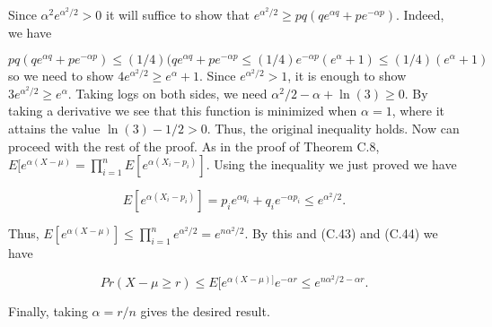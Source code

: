 \documentclass{article}
\begin{document}
Since $ \alpha^2e^{\alpha^2/2} > 0$ it will suffice to show that $e^{\alpha^2/2} \geq pq(qe^{\alpha q} + pe^{-\alpha p})$.  Indeed, we have

\[pq(qe^{\alpha q} + pe^{-\alpha p}) \leq (1/4)(qe^{\alpha q} + pe^{-\alpha p} \leq (1/4)e^{-\alpha p}(e^\alpha + 1) \leq (1/4)(e^\alpha + 1)\]
so we need to show $4e^{\alpha^2/2} \geq e^{\alpha} + 1$.  Since $e^{\alpha^2/2} > 1$, it is enough to show $3e^{\alpha^2/2} \geq e^{\alpha}$.  Taking logs on both sides, we need $\alpha^2/2 - \alpha + \ln(3) \geq 0$.  By taking a derivative we see that this function is minimized when $\alpha = 1$, where it attains the value $\ln(3)-1/2 > 0$.  Thus, the original inequality holds.  Now can proceed with the rest of the proof.  As in the proof of Theorem C.8, $E[e^{\alpha(X-\mu)} = \prod_{i=1}^n E[e^{\alpha(X_i-p_i)}]$.  Using the inequality we just proved we have 

\[ E[e^{\alpha(X_i-p_i)}] = p_ie^{\alpha q_i} + q_ie^{-\alpha p_i} \leq e^{\alpha^2/2}.\]

Thus, $E[e^{\alpha(X-\mu)}] \leq \prod_{i=1}^n e^{\alpha^2/2} = e^{n\alpha^2/2}$.  By this and (C.43) and (C.44) we have 

\[Pr(X-\mu \geq r) \leq E[e^{\alpha(X-\mu)]}e^{-\alpha r} \leq e^{n \alpha^2/2 - \alpha r}.\]

Finally, taking $\alpha = r/n$ gives the desired result. \\
\end{document}

